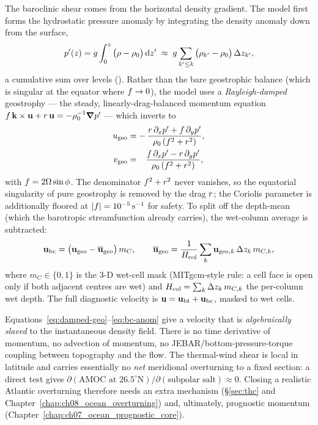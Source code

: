 The baroclinic shear comes from the horizontal density gradient. The model first
forms the hydrostatic pressure anomaly by integrating the density anomaly down from
the surface,
\begin{equation}
  p'(z) = g \int_0^{z}\big(\rho-\rho_0\big)\,\mathrm{d} z'
  \;\approx\; g\sum_{k'\le k}\big(\rho_{k'}-\rho_0\big)\,\Delta z_{k'},
  \label{eq:hydro}
\end{equation}
a cumulative sum over levels (). Rather than the bare geostrophic
balance (which is singular at the equator where $f\to 0$), the model uses a
\emph{Rayleigh-damped} geostrophy --- the steady, linearly-drag-balanced momentum
equation $f\,\mathbf{k}\times\mathbf{u} + r\,\mathbf{u} = -\rho_0^{-1}\boldsymbol{\nabla}p'$ ---
which inverts to
\begin{align}
  u_{\mathrm{geo}} &= -\,\frac{r\,\partial_xp' + f\,\partial_yp'}
                                {\rho_0\,(f^2+r^2)},\\
  v_{\mathrm{geo}} &= \phantom{-}\frac{f\,\partial_xp' - r\,\partial_yp'}
                                {\rho_0\,(f^2+r^2)},
  \label{eq:damped-geo}
\end{align}
with $f = 2\Omega\sin\phi$. The denominator $f^2+r^2$ never vanishes, so the
equatorial singularity of pure geostrophy is removed by the drag $r$; the
Coriolis parameter is additionally floored at $|f|=10^{-5}\,\mathrm{s^{-1}}$ for
safety. To split off the depth-mean (which the barotropic streamfunction already
carries), the wet-column average is subtracted:
\begin{equation}
  \mathbf{u}_{\mathrm{bc}} = \big(\mathbf{u}_{\mathrm{geo}} - \overline{\mathbf{u}}_{\mathrm{geo}}\big)\,m_C,
  \qquad
  \overline{\mathbf{u}}_{\mathrm{geo}} = \frac{1}{H_{\mathrm{col}}}\sum_k \mathbf{u}_{\mathrm{geo},k}\,\Delta z_k\,m_{C,k},
  \label{eq:bc-anom}
\end{equation}
where $m_C\in\{0,1\}$ is the 3-D wet-cell mask (MITgcm-style  rule: a
cell face is open only if both adjacent centres are wet) \citep{adcroft1997} and $H_{\mathrm{col}}=\sum_k\Delta
z_k\,m_{C,k}$ the per-column wet depth. The full diagnostic velocity is
$\mathbf{u} = \mathbf{u}_{\mathrm{bt}} + \mathbf{u}_{\mathrm{bc}}$, masked to wet cells.

\begin{remark}
Equations~\eqref{eq:damped-geo}--\eqref{eq:bc-anom} give a velocity that is
\emph{algebraically slaved} to the instantaneous density field. There is no time
derivative of momentum, no advection of momentum, no JEBAR/bottom-pressure-torque
coupling between topography and the flow. The thermal-wind shear is local in
latitude and carries essentially no \emph{net} meridional overturning to a fixed
section: a direct test gives $\partial(\text{AMOC at }26.5^\circ\mathrm{N})/
\partial(\text{subpolar salt})\approx 0$. Closing a realistic Atlantic overturning
therefore needs an extra mechanism (\S\ref{sec:thc} and
Chapter~\ref{chap:ch08_ocean_overturning}) and, ultimately, prognostic momentum
(Chapter~\ref{chap:ch07_ocean_prognostic_core}).
\end{remark}

